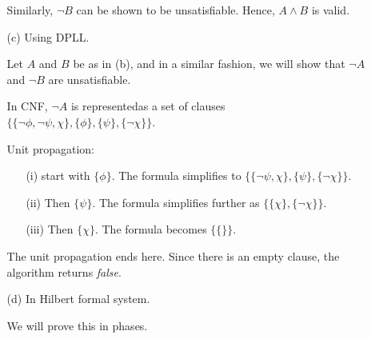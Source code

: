 \begin{itemize}
\begin{itemize}
        Similarly, $\neg B$ can be shown to be unsatisfiable. Hence, $A \land B$ is valid.
    
        \item[(c)] Using DPLL.
        
        Let $A$ and $B$ be as in (b), and in a similar fashion, we will show that $\neg A$ and $\neg B$ are unsatisfiable.

        In CNF, $\neg A$ is representedas a set of clauses 
        $\{\{\neg \phi, \neg \psi, \chi\}, \{\phi\}, \{\psi\}, \{\neg \chi\} \}$.
        
        Unit propagation:
        \begin{itemize}
            \item[(i)] start with $\{\phi\}$. The formula simplifies to $\{\{\neg \psi, \chi\}, \{\psi\}, \{\neg \chi\} \}$.
            \item[(ii)] Then $\{\psi\}$. The formula simplifies further as $\{\{\chi\}, \{\neg \chi\}\}$.
            \item[(iii)] Then $\{\chi\}$. The formula becomes $\{\{\}\}$.  
        \end{itemize}
        The unit propagation ends here. Since there is an empty clause, the algorithm returns \emph{false}.

        \item[(d)] In Hilbert formal system.
        
        We will prove this in phases.
        

\end{itemize}
\end{itemize}
